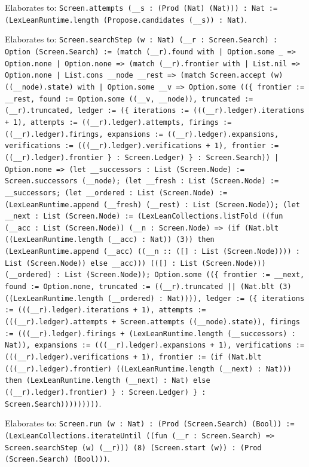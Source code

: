 \documentclass[11pt]{article}
\begin{document}
\noindent Elaborates to: \texttt{Screen.attempts (\_\_s : (Prod (Nat) (Nat))) : Nat := (LexLeanRuntime.length (Propose.candidates (\_\_s)) : Nat)}.\par
\noindent Elaborates to: \texttt{Screen.searchStep (w : Nat) (\_\_r : Screen.Search) : Option (Screen.Search) := (match (\_\_r).found with | Option.some \_ => Option.none | Option.none => (match (\_\_r).frontier with | List.nil => Option.none | List.cons \_\_node \_\_rest => (match Screen.accept (w) ((\_\_node).state) with | Option.some \_\_v => Option.some ((\{ frontier := \_\_rest, found := Option.some ((\_\_v, \_\_node)), truncated := (\_\_r).truncated, ledger := (\{ iterations := (((\_\_r).ledger).iterations + 1), attempts := ((\_\_r).ledger).attempts, firings := ((\_\_r).ledger).firings, expansions := ((\_\_r).ledger).expansions, verifications := (((\_\_r).ledger).verifications + 1), frontier := ((\_\_r).ledger).frontier \} : Screen.Ledger) \} : Screen.Search)) | Option.none => (let \_\_successors : List (Screen.Node) := Screen.successors (\_\_node); (let \_\_fresh : List (Screen.Node) := \_\_successors; (let \_\_ordered : List (Screen.Node) := (LexLeanRuntime.append (\_\_fresh) (\_\_rest) : List (Screen.Node)); (let \_\_next : List (Screen.Node) := (LexLeanCollections.listFold ((fun (\_\_acc : List (Screen.Node)) (\_\_n : Screen.Node) => (if (Nat.blt ((LexLeanRuntime.length (\_\_acc) : Nat)) (3)) then (LexLeanRuntime.append (\_\_acc) ((\_\_n :: ([] : List (Screen.Node)))) : List (Screen.Node)) else \_\_acc))) (([] : List (Screen.Node))) (\_\_ordered) : List (Screen.Node)); Option.some ((\{ frontier := \_\_next, found := Option.none, truncated := ((\_\_r).truncated || (Nat.blt (3) ((LexLeanRuntime.length (\_\_ordered) : Nat)))), ledger := (\{ iterations := (((\_\_r).ledger).iterations + 1), attempts := (((\_\_r).ledger).attempts + Screen.attempts ((\_\_node).state)), firings := (((\_\_r).ledger).firings + (LexLeanRuntime.length (\_\_successors) : Nat)), expansions := (((\_\_r).ledger).expansions + 1), verifications := (((\_\_r).ledger).verifications + 1), frontier := (if (Nat.blt (((\_\_r).ledger).frontier) ((LexLeanRuntime.length (\_\_next) : Nat))) then (LexLeanRuntime.length (\_\_next) : Nat) else ((\_\_r).ledger).frontier) \} : Screen.Ledger) \} : Screen.Search)))))))))}.\par
\noindent Elaborates to: \texttt{Screen.run (w : Nat) : (Prod (Screen.Search) (Bool)) := (LexLeanCollections.iterateUntil ((fun (\_\_r : Screen.Search) => Screen.searchStep (w) (\_\_r))) (8) (Screen.start (w)) : (Prod (Screen.Search) (Bool)))}.\par
\end{document}
